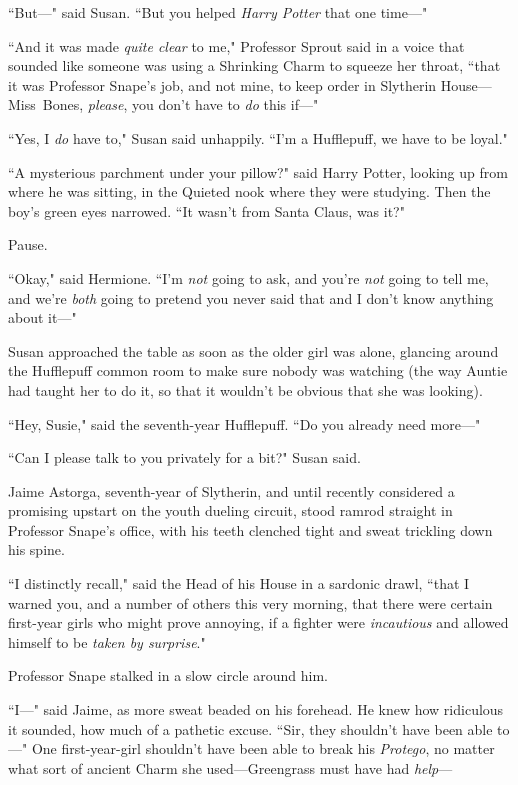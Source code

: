 ``But—" said Susan. ``But you helped \emph{Harry Potter} that one time—"

``And it was made \emph{quite clear} to me," Professor Sprout said in a voice that sounded like someone was using a Shrinking Charm to squeeze her throat, ``that it was Professor Snape's job, and not mine, to keep order in Slytherin House—Miss~Bones, \emph{please}, you don't have to \emph{do} this if—"

``Yes, I \emph{do} have to," Susan said unhappily. ``I'm a Hufflepuff, we have to be loyal."

\later

``A mysterious parchment under your pillow?" said Harry Potter, looking up from where he was sitting, in the Quieted nook where they were studying. Then the boy's green eyes narrowed. ``It wasn't from Santa Claus, was it?"

Pause.

``Okay," said Hermione. ``I'm \emph{not} going to ask, and you're \emph{not} going to tell me, and we're \emph{both} going to pretend you never said that and I don't know anything about it—"

\later

Susan approached the table as soon as the older girl was alone, glancing around the Hufflepuff common room to make sure nobody was watching (the way Auntie had taught her to do it, so that it wouldn't be obvious that she was looking).

``Hey, Susie," said the seventh-year Hufflepuff. ``Do you already need more—"

``Can I please talk to you privately for a bit?" Susan said.

\later

Jaime Astorga, seventh-year of Slytherin, and until recently considered a promising upstart on the youth dueling circuit, stood ramrod straight in Professor Snape's office, with his teeth clenched tight and sweat trickling down his spine.

``I distinctly recall," said the Head of his House in a sardonic drawl, ``that I warned you, and a number of others this very morning, that there were certain first-year girls who might prove annoying, if a fighter were \emph{incautious} and allowed himself to be \emph{taken by surprise}."

Professor Snape stalked in a slow circle around him.

``I—" said Jaime, as more sweat beaded on his forehead. He knew how ridiculous it sounded, how much of a pathetic excuse. ``Sir, they shouldn't have been able to—" One first-year-girl shouldn't have been able to break his \emph{Protego}, no matter what sort of ancient Charm she used—Greengrass must have had \emph{help}—

